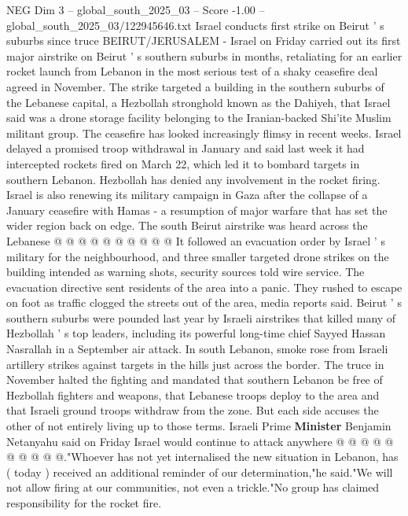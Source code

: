 \begin{textsample}{NEG Dim 3 – global\_south\_2025\_03 – Score -1.00 – global\_south\_2025\_03/122945646.txt}  \label{ex:f3_neg_424}
Israel conducts first strike on Beirut ' s suburbs since truce BEIRUT/JERUSALEM - Israel on Friday carried out its first major airstrike on Beirut ' s southern suburbs in months, retaliating for an earlier rocket launch from Lebanon in the most serious test of a shaky ceasefire deal agreed in November.
The strike targeted a building in the southern suburbs of the Lebanese capital, a Hezbollah stronghold known as the Dahiyeh, that Israel said was a drone storage facility belonging to the Iranian-backed Shi'ite Muslim militant group.
The ceasefire has looked increasingly flimsy in recent weeks.
Israel delayed a promised troop withdrawal in January and said last week it had intercepted rockets fired on March 22, which led it to bombard targets in southern Lebanon.
Hezbollah has denied any involvement in the rocket firing.
Israel is also renewing its military campaign in Gaza after the collapse of a January ceasefire with Hamas - a resumption of major warfare that has set the wider region back on edge.
The south Beirut airstrike was heard across the Lebanese @ @ @ @ @ @ @ @ @ @ It followed an evacuation order by Israel ' s military for the neighbourhood, and three smaller targeted drone strikes on the building intended as warning shots, security sources told wire service.
The evacuation directive sent residents of the area into a panic.
They rushed to escape on foot as traffic clogged the streets out of the area, media reports said.
Beirut ' s southern suburbs were pounded last year by Israeli airstrikes that killed many of Hezbollah ' s top leaders, including its powerful long-time chief Sayyed Hassan Nasrallah in a September air attack.
In south Lebanon, smoke rose from Israeli artillery strikes against targets in the hills just across the border.
The truce in November halted the fighting and mandated that southern Lebanon be free of Hezbollah fighters and weapons, that Lebanese troops deploy to the area and that Israeli ground troops withdraw from the zone.
But each side accuses the other of not entirely living up to those terms.
Israeli Prime \textbf{Minister} Benjamin Netanyahu said on Friday Israel would continue to attack anywhere @ @ @ @ @ @ @ @ @ @."Whoever has not yet internalised the new situation in Lebanon, has ( today ) received an additional reminder of our determination,"he said."We will not allow firing at our communities, not even a trickle."No group has claimed responsibility for the rocket fire.

\end{textsample}
